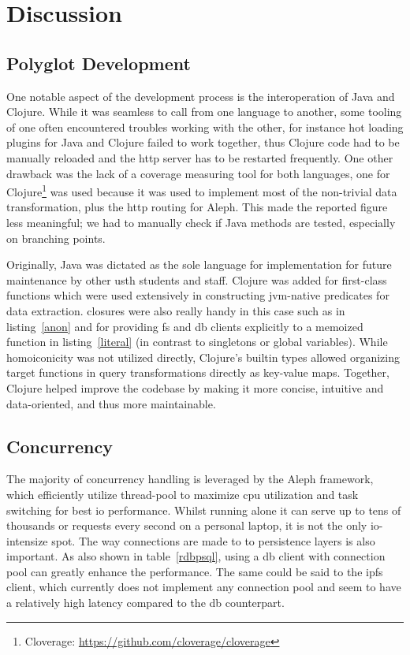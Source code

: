 \section{Discussion}

\subsection{Polyglot Development}
One notable aspect of the development process is the interoperation of Java
and Clojure.  While it was seamless to call from one language to another,
some tooling of one often encountered troubles working with the other,
for instance hot loading plugins for Java and Clojure failed to work together,
thus Clojure code had to be manually reloaded and the \gls{http} server
has to be restarted frequently.  One other drawback was the lack of a coverage
measuring tool for both languages, one for Clojure\footnote{Cloverage:
\url{https://github.com/cloverage/cloverage}} was used because it was used
to implement most of the non-trivial data transformation, plus the \gls{http}
routing for Aleph.  This made the reported figure less meaningful; we had
to manually check if Java methods are tested, especially on branching points.

Originally, Java was dictated as the sole language for implementation
for future maintenance by other \gls{usth} students and staff.  Clojure
was added for first-class functions which were used extensively in constructing
\gls{jvm}-native predicates for data extraction.  \Glspl{closure} were also
really handy in this case such as in listing~\ref{anon} and for providing
\gls{fs} and \gls{db} clients explicitly to a memoized function
in listing~\ref{literal} (in contrast to singletons or global variables).
While \gls{homoiconicity} was not utilized directly, Clojure's builtin types
allowed organizing target functions in query transformations directly
as key-value maps.  Together, Clojure helped improve the codebase by making it
more concise, intuitive and data-oriented, and thus more maintainable.

\subsection{Concurrency}
The majority of concurrency handling is leveraged by the Aleph framework,
which efficiently utilize thread-pool to maximize \gls{cpu} utilization
and task switching for best \gls{io} performance.  Whilst running alone it can
serve up to tens of thousands or requests every second on a personal laptop,
it is not the only \gls{io}-intensize spot.  The way connections are made to
to persistence layers is also important.  As also shown in table~\ref{rdbpsql},
using a \gls{db} client with connection pool can greatly enhance
the performance.  The same could be said to the \gls{ipfs} client,
which currently does not implement any connection pool and seem to have
a relatively high latency compared to the \gls{db} counterpart.

